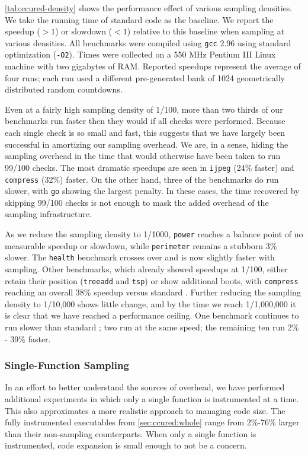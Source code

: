 \autoref{tab:ccured-density} shows the performance effect of various
sampling densities.  We take the running time of standard \CCured code
as the baseline.  We report the speedup ($>1$) or slowdown ($<1$)
relative to this baseline when sampling at various densities.  All
benchmarks were compiled using \texttt{gcc} 2.96 using standard
optimization (\texttt{-O2}).  Times were collected on a 550 MHz
Pentium III Linux machine with two gigabytes of RAM.  Reported
speedups represent the average of four runs; each run used a different
pre-generated bank of 1024 geometrically distributed random
countdowns.

Even at a fairly high sampling density of 1/100, more than two thirds
of our benchmarks run faster then they would if all checks were
performed.  Because each single check is so small and fast, this
suggests that we have largely been successful in amortizing our
sampling overhead.  We are, in a sense, hiding the sampling overhead
in the time that would otherwise have been taken to run 99/100 checks.
The most dramatic speedups are seen in \texttt{ijpeg} (24\% faster)
and \texttt{compress} (32\%) faster.  On the other hand, three of the
benchmarks do run slower, with \texttt{go} showing the largest
penalty.  In these cases, the time recovered by skipping 99/100 checks
is not enough to mask the added overhead of the sampling
infrastructure.

As we reduce the sampling density to 1/1000, \texttt{power} reaches a
balance point of no measurable speedup or slowdown, while
\texttt{perimeter} remains a stubborn 3\% slower.  The \texttt{health}
benchmark crosses over and is now slightly faster with sampling.
Other benchmarks, which already showed speedups at 1/100, either
retain their position (\texttt{treeadd} and \texttt{tsp}) or show
additional boots, with \texttt{compress} reaching an overall 38\%
speedup versus standard \CCured.  Further reducing the sampling
density to 1/10,000 shows little change, and by the time we reach
1/1,000,000 it is clear that we have reached a performance ceiling.
One benchmark continues to run slower than standard \CCured; two run
at the same speed; the remaining ten run 2\% - 39\% faster.

\subsubsection{Single-Function Sampling}

In an effort to better understand the sources of overhead, we have
performed additional experiments in which only a single function is
instrumented at a time.  This also approximates a more realistic
approach to managing code size.  The fully instrumented executables
from \autoref{sec:ccured:whole} range from 2\%-76\% larger than their
non-sampling counterparts.  When only a single function is
instrumented, code expansion is small enough to not be a concern.

